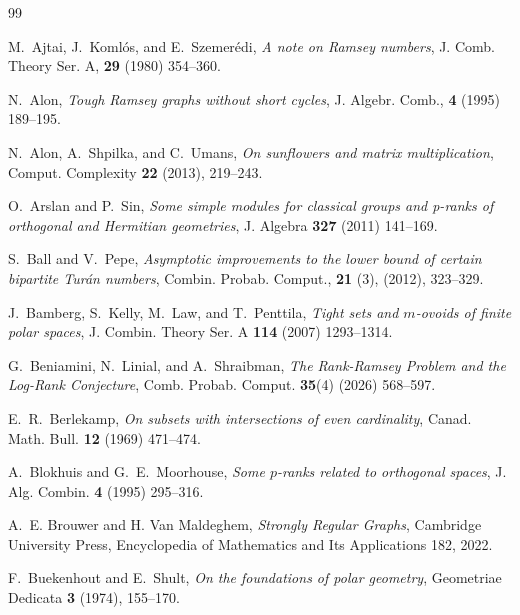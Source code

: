\documentclass[a4paper,11pt]{amsproc}
\theoremstyle{plain}
\theoremstyle{definition}
\newcommand{\<}{\langle}
\renewcommand{\>}{\rangle} %
\begin{document}
\begin{thebibliography}{99}



 M.\ Ajtai, J.\ Koml\'os, and E.\ Szemer\'edi, 
{\it A note on {R}amsey numbers}, 
J. Comb. Theory Ser. A, {\bf 29} (1980) 354--360.

 N.\ Alon, 
{\it Tough Ramsey graphs without short cycles},
J. Algebr. Comb., {\bf 4} (1995) 189--195.


N.\ Alon, A.\ Shpilka, and C.\ Umans,
{\it On sunflowers and matrix multiplication},
Comput. Complexity {\bf 22} (2013), 219--243.

 
O.\ Arslan and P.\ Sin,
{\it Some simple modules for classical groups and p-ranks of orthogonal and Hermitian geometries},
J. Algebra {\bf 327} (2011) 141--169.

S.~Ball and V.~Pepe,
{\it Asymptotic improvements to the lower bound of certain bipartite Tur\'{a}n numbers},
Combin. Probab. Comput., {\bf 21} (3), (2012), 323--329.



J.\ Bamberg, S.\ Kelly, M.\ Law, and T.\ Penttila,
{\it Tight sets and $m$-ovoids of finite polar spaces},
J. Combin. Theory Ser. A {\bf 114} (2007) 1293--1314.


G.~Beniamini, N.~Linial, and A.~Shraibman,
{\it The Rank-Ramsey Problem and the Log-Rank Conjecture},
Comb. Probab. Comput. {\bf 35}(4) (2026) 568--597. 


E.~R.~Berlekamp, 
{\it On subsets with intersections of even cardinality},
Canad. Math. Bull. {\bf 12} (1969) 471--474.


A.~Blokhuis and G.~E.~Moorhouse,
{\it Some $p$-ranks related to orthogonal spaces},
J. Alg. Combin. {\bf 4} (1995) 295--316.

A.~E. Brouwer and H. Van Maldeghem,
{\it Strongly Regular Graphs},
Cambridge University Press,
Encyclopedia of Mathematics and Its Applications 182, 2022.

F.~Buekenhout and E.~Shult, 
{\it On the foundations of polar geometry}, Geometriae Dedicata {\bf 3} (1974), 155--170.


\end{thebibliography}
\end{document}
